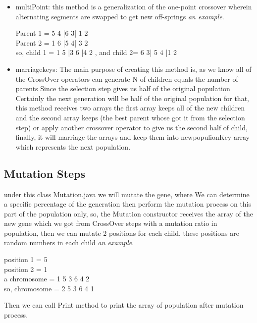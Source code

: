 \begin{itemize}
{    }
    \item{\textsf{multiPoint:} this method is a generalization of the one-point crossover wherein alternating segments are swapped to get new off-springs \textit{an example}.
    \begin{tcolorbox}[breakable,notitle,boxrule=0pt,colback=blue!20,colframe=blue!20]
        { Parent 1 = 5 4 |6 3| 1 2\\ 
          Parent 2 = 1 6 |5 4| 3 2\\
        so, child 1 = 1 5 |3 6 |4 2 , and child 2= 6 3| 5 4 |1 2 }
        \end{tcolorbox}
    }
    \item{\textsf{marriagekeys:} The main purpose of creating this method is, as we know all of the CrossOver operators can generate N of children equals the number of parents Since the selection step gives us half of the original population Certainly the next generation will be half of the original population for that, this method receives two arrays the first array keeps all of the new children and the second array keeps (the best parent whose got it from the selection step) or apply another crossover operator to give us the second half of child, finally, it will marriage the arrays and keep them into newpopulionKey array which represents the next population.}
\end{itemize}
\subsection{Mutation Steps}
under this class Mutation.java we will mutate the gene, where We can determine a specific percentage of the generation then perform the mutation process on this part of the population only, so, the Mutation constructor receives the array of the new gene which we got from CrossOver steps with a mutation ratio in population, then we can mutate 2 positions for each child, these positions are random numbers in each child \textit{an example}.
\begin{tcolorbox}[breakable,notitle,boxrule=0pt,colback=blue!20,colframe=blue!20]
    {position 1 = 5 \\
     position 2 = 1 \\
     a chromosome = \textsf{1} 5 3 6 4 \textsf{2} \\
     so, chromosome = \textsf{2} 5 3 6 4 \textsf{1} }
    \end{tcolorbox}
Then we can call Print method to print the array of population after mutation process.
